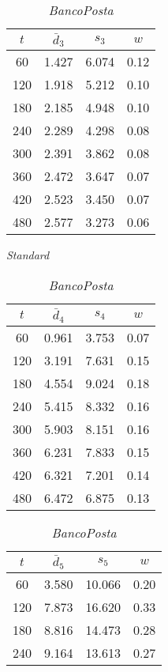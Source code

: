 \begin{table}[ht]
\begin{subtable}[b]{0.33\textwidth}
\centering
{\tablecolors
\begin{tabular}{|c|c|c|c|}
\hline
$t$ & $\bar{d}_3$ & $s_3$ & $w$\\
\hline
60 & 1.427 & 6.074 & 0.12 \\
\hline
120 & 1.918 & 5.212 & 0.10 \\
\hline
180 & 2.185 & 4.948 & 0.10 \\
\hline
240 & 2.289 & 4.298 & 0.08 \\
\hline
300 & 2.391 & 3.862 & 0.08 \\
\hline
360 & 2.472 & 3.647 & 0.07 \\
\hline
420 & 2.523 & 3.450 & 0.07 \\
\hline
480 & 2.577 & 3.273 & 0.06 \\
\hline
\end{tabular}}
\caption{\pp{} \textsl{Standard}}
\end{subtable}%
\begin{subtable}[b]{0.33\textwidth}
\centering
{\tablecolors
\begin{tabular}{|c|c|c|c|}
\hline
$t$ & $\bar{d}_4$ & $s_4$ & $w$\\
\hline
60 & 0.961 & 3.753 & 0.07 \\
\hline
120 & 3.191 & 7.631 & 0.15 \\
\hline
180 & 4.554 & 9.024 & 0.18 \\
\hline
240 & 5.415 & 8.332 & 0.16 \\
\hline
300 & 5.903 & 8.151 & 0.16 \\
\hline
360 & 6.231 & 7.833 & 0.15 \\
\hline
420 & 6.321 & 7.201 & 0.14 \\
\hline
480 & 6.472 & 6.875 & 0.13 \\
\hline
\end{tabular}}
\caption{\sr{} \textsl{BancoPosta}}
\end{subtable}%
\begin{subtable}[b]{0.33\textwidth}
\centering
{\tablecolors
\begin{tabular}{|c|c|c|c|}
\hline
$t$ & $\bar{d}_5$ & $s_5$ & $w$\\
\hline
60 & 3.580 & 10.066 & 0.20 \\
\hline
120 & 7.873 & 16.620 & 0.33 \\
\hline
180 & 8.816 & 14.473 & 0.28 \\
\hline
240 & 9.164 & 13.613 & 0.27 \\
\hline

\end{tabular}}
\end{subtable}
\end{table}

